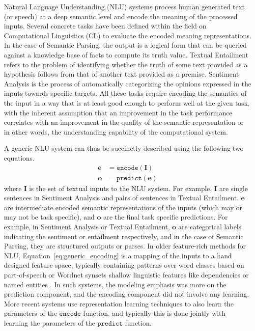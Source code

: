Natural Language Understanding (NLU) systems process human generated text (or speech) at a deep semantic level and encode the meaning
of the processed inputs. Several concrete tasks have been defined within the field on Computational Linguistics (CL) to evaluate the encoded meaning representations.
In the case of Semantic Parsing, the output is a logical form that can be queried against a knowledge base of facts to compute its truth value. Textual Entailment refers to the 
problem of identifying whether the truth of some text provided as a hypothesis follows from that of another text provided as a premise. Sentiment Analysis is the process of 
automatically categorizing the opinions expressed in the inputs towards specific targets. All these tasks require encoding the semantics of the input in a way that is
at least good enough to perform well at the given task, with the inherent assumption that an improvement in the task performance correlates with an improvement in the
quality of the semantic representation or in other words, the understanding capability of the computational system.

A generic NLU system can thus be succinctly described using the following two equations.
\begin{align}
 \mathbf{e} &= \mathtt{encode}(\mathbf{I}) \label{eq:generic_encoding}\\
 \mathbf{o} &= \mathtt{predict}(\mathbf{e}) \label{eq:generic_prediction}
\end{align}
where $\mathbf{I}$ is the set of textual inputs to the NLU system. 
For example, $\mathbf{I}$  are single sentences in Sentiment Analysis and pairs of sentences in Textual Entailment. $\textbf{e}$ are intermediate 
encoded semantic representations of the inputs (which may or may not be task specific), and $\mathbf{o}$ are the final task specific predictions. For example, in Sentiment Analysis or Textual Entailment, 
$\mathbf{o}$ are categorical labels indicating the sentiment or entailment respectively, and in the case of Semantic Parsing, they are structured outputs or parses. In older feature-rich methods for NLU, 
Equation~\ref{eq:generic_encoding} is a mapping of the inputs to a hand designed feature space, typically containing patterns over word classes based on part-of-speech \cite{corley2005measuring} or Wordnet synsets \cite{moldovan2001logic} 
shallow linguistic features like dependencies \cite{bos2005recognising} or named entities \cite{tatu2005semantic}. In such systems,
the modeling emphasis was more on the prediction component, and the encoding component did not involve any learning. More recent systems \cite{weston2014memory,hermann2015teaching,Sukhbaatar2015EndToEndMN,Xiong2016DynamicMN} 
use representation learning techniques to also learn the parameters of the
$\mathtt{encode}$ function, and typically this is done jointly with learning the parameters of the $\mathtt{predict}$ function.

